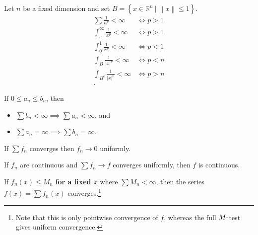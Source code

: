 \begin{proposition}[p-tests]

Let \(n\) be a fixed dimension and set
\(B = \left\{{x\in {\mathbb{R}}^n {~\mathrel{\Big|}~}{\left\lVert {x} \right\rVert} \leq 1}\right\}\).
\begin{align*}
\sum \frac 1 {n^p} < \infty &\iff p>1 \\
\int_\varepsilon^\infty \frac 1 {x^p} < \infty 
&\iff p>1 \\
\int_0^1 \frac 1 {x^p} < \infty 
&\iff p<1 \\
\int_B \frac{1}{{\left\lvert {x} \right\rvert}^p} < \infty &\iff p < n \\
\int_{B^c} \frac{1}{{\left\lvert {x} \right\rvert}^p} < \infty &\iff p > n \\
.\end{align*}

\end{proposition}

\begin{proposition}

If \(0\leq a_n \leq b_n\), then

\begin{itemize}
\tightlist
\item
  \(\sum b_n < \infty \implies \sum a_n < \infty\), and
\item
  \(\sum a_n = \infty \implies \sum b_n = \infty\).
\end{itemize}

\end{proposition}

\begin{proposition}

If \(\sum f_n\) converges then \(f_n \to 0\) uniformly.

\end{proposition}

\begin{corollary}

If \(f_n\) are continuous and \(\sum f_n \to f\) converges uniformly,
then \(f\) is continuous.

\end{corollary}

\begin{proposition}

If \(f_n(x) \leq M_n\) \textbf{for a fixed \(x\)} where
\(\sum M_n < \infty\), then the series \(f(x) = \sum f_n(x)\)
converges.\footnote{Note that this is only pointwise convergence of
  \(f\), whereas the full \(M{\hbox{-}}\)test gives uniform convergence.}

\end{proposition}

